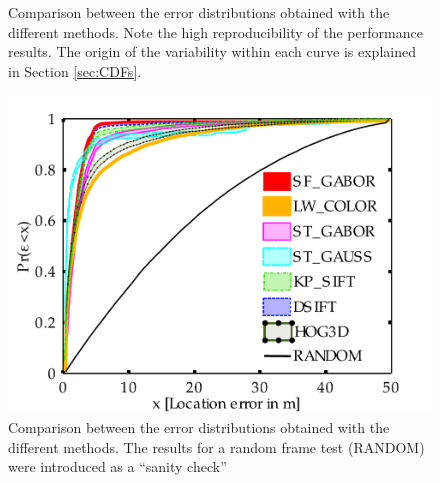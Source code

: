 \begin{figure}[h!]
\caption{Comparison between the error distributions obtained with the different methods. Note the high reproducibility of the performance results. The origin of the variability within each curve is explained in Section \ref{sec:CDFs}.}
\label{fig:CDFglobal}
\end{figure}

\begin{figure}
\centering
\includegraphics[width=\textwidth]{./gfx/Chapter04/CDF_Figs/all.pdf}
\caption{Comparison between the error distributions obtained with the different methods. The results for a random frame test (RANDOM) were introduced as a ``sanity check''}
\label{fig:CDFall}
\end{figure}



